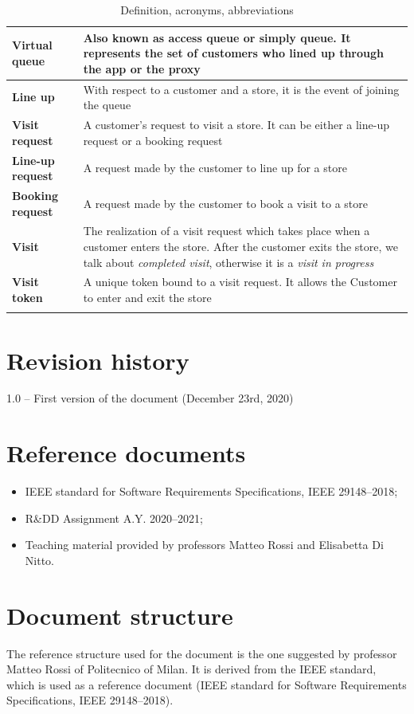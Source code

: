 \documentclass[a4paper,oneside,11pt]{book}   %
\begin{document}
\begin{longtable}[c] { |>{\bfseries{}}C{0.25\textwidth}|H{0.55\textwidth}| }
        Virtual queue & Also known as access queue or simply queue. It represents the set of customers who lined up through the app or the proxy \\ \hline
        Line up & With respect to a customer and a store, it is the event of joining the queue \\ \hline
        Visit request & A customer’s request to visit a store. It can be either a line-up request or a booking request \\ \hline
        Line-up request & A request made by the customer  to line up for a store \\ \hline
        Booking request & A request made by the customer  to book a visit to a store \\ \hline 
        Visit & The realization of a visit request which takes place when a customer enters the store. After the customer exits the store, we talk about \textit{completed visit}, otherwise it is a \textit{visit in progress} \\ \hline
        Visit token & A unique token bound to a visit request. It allows the Customer to enter and exit the store \\
        \hline
    \caption{Definition, acronyms, abbreviations}
    \label{table:definitions_acronyms_abbreviations}
    \end{longtable} %
    
    \section{Revision history}
    1.0 -- First version of the document (December 23rd, 2020)
    
    \section{Reference documents}
    \begin{itemize}
        \item IEEE standard for Software Requirements Specifications, IEEE 29148--2018;
        \item R\&DD Assignment A.Y. 2020--2021;
        \item Teaching material provided by professors Matteo Rossi and Elisabetta Di Nitto.
    \end{itemize}

    \section{Document structure}
    The reference structure used for the document is the one suggested by professor Matteo Rossi of Politecnico of Milan. It is derived from the IEEE standard, which is used as a reference document (IEEE standard for Software Requirements Specifications, IEEE 29148--2018).
    
\end{document}
